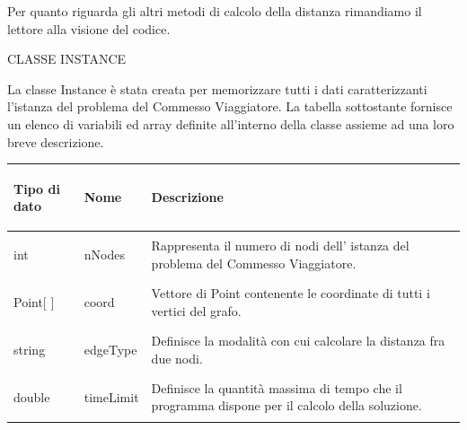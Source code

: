 \documentclass[11pt]{article}
\begin{document}
Per quanto riguarda gli altri metodi di calcolo della distanza rimandiamo il lettore alla visione del codice.

\vspace{2\baselineskip}
CLASSE INSTANCE
\vspace{2\baselineskip}

La classe Instance è stata creata per memorizzare tutti i dati caratterizzanti l'istanza del problema del Commesso Viaggiatore. La tabella sottostante fornisce un elenco di variabili ed array definite all'interno della classe assieme ad una loro breve descrizione. 


\begin{center}

    \begin{longtable}{ | p{4cm} | p{4cm} | p{7cm} |}
    \hline
    \begin{center} \textbf{Tipo di dato} \end{center} & \begin{center}  \textbf{Nome} \end{center}& 
    \begin{center} \textbf{Descrizione} \end{center}\\ \hline
    \begin{center} int \end{center} & \begin{center} nNodes \end{center}& \vfill Rappresenta il numero di nodi dell' istanza del problema del Commesso Viaggiatore.\vfill \\ \hline
    \begin{center} Point[ ] \end{center} & \begin{center} coord \end{center}& \vfill Vettore di Point contenente le coordinate di tutti i vertici del grafo.\vfill\\ \hline
    \begin{center} string \end{center} & \begin{center} edgeType \end{center}&\vfill Definisce la modalità con cui calcolare la distanza fra due nodi.\vfill \\ \hline
    \begin{center} double \end{center} & \begin{center} timeLimit \end{center}& \vfill Definisce la quantità massima di tempo che il programma dispone per il calcolo della soluzione.\vfill \\ \hline

\end{longtable}
\end{center}
\end{document}
